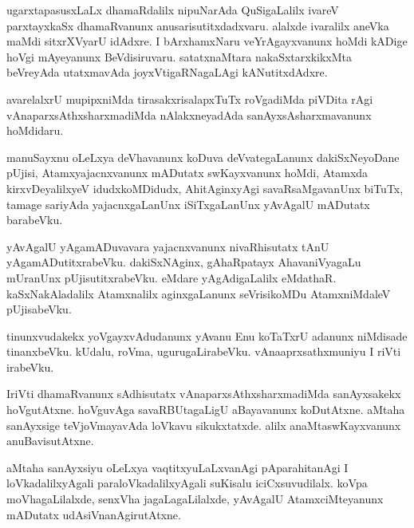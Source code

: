 \documentclass{article}
\begin{document}
\begin{mn}
ugarxtapasusxLaLx dhamaRdalilx nipuNarAda QuSigaLalilx ivareV
parxtayxkaSx dhamaRvanunx anusarisutitxdadxvaru. alalxde ivaralilx
aneVka maMdi sitxrXVyarU idAdxre. I bArxhamxNaru veYrAgayxvanunx hoMdi
kADige hoVgi mAyeyanunx BeVdisiruvaru. satatxnaMtara nakaSxtarxkikxMta
beVreyAda utatxmavAda joyxVtigaRNagaLAgi kANutitxdAdxre.
\end{mn}

\begin{mn}
avarelalxrU mupipxniMda tirasakxrisalapxTuTx roVgadiMda piVDita rAgi
vAnaparxsAthxsharxmadiMda nAlakxneyadAda sanAyxsAsharxmavanunx hoMdidaru.
\end{mn}

\begin{mn}
manuSayxnu oLeLxya deVhavanunx koDuva deVvategaLanunx dakiSxNeyoDane
pUjisi, Atamxyajacnxvanunx mADutatx swKayxvanunx hoMdi, Atamxda
kirxvDeyalilxyeV idudxkoMDidudx, AhitAginxyAgi savaRsaMgavanUnx
biTuTx, tamage sariyAda yajacnxgaLanUnx iSiTxgaLanUnx yAvAgalU
mADutatx barabeVku.
\end{mn}

\begin{mn}%
yAvAgalU yAgamADuvavara yajacnxvanunx nivaRhisutatx tAnU
yAgamADutitxrabeVku. dakiSxNAginx, gAhaRpatayx AhavaniVyagaLu mUranUnx
pUjisutitxrabeVku. eMdare yAgAdigaLalilx eMdathaR. kaSxNakAladalilx
Atamxnalilx aginxgaLanunx seVrisikoMDu AtamxniMdaleV pUjisabeVku.
\end{mn}

\begin{mn}
tinunxvudakekx yoVgayxvAdudanunx yAvanu Enu koTaTxrU adanunx niMdisade
tinanxbeVku. kUdalu, roVma, ugurugaLirabeVku. vAnaaprxsathxmuniyu I
riVti irabeVku.
\end{mn}

\begin{mn}
IriVti dhamaRvanunx sAdhisutatx vAnaparxsAthxsharxmadiMda sanAyxsakekx
hoVgutAtxne. hoVguvAga savaRBUtagaLigU aBayavanunx koDutAtxne. aMtaha
sanAyxsige teVjoVmayavAda loVkavu sikukxtatxde. alilx
anaMtaswKayxvanunx anuBavisutAtxne.
\end{mn}

\begin{mn}%
aMtaha sanAyxsiyu oLeLxya vaqtitxyuLaLxvanAgi pAparahitanAgi I
loVkadalilxyAgali paraloVkadalilxyAgali suKisalu
iciCxsuvudilalx. koVpa moVhagaLilalxde, senxVha jagaLagaLilalxde,
yAvAgalU AtamxciMteyanunx mADutatx udAsiVnanAgirutAtxne.
\end{mn}
\end{document}
